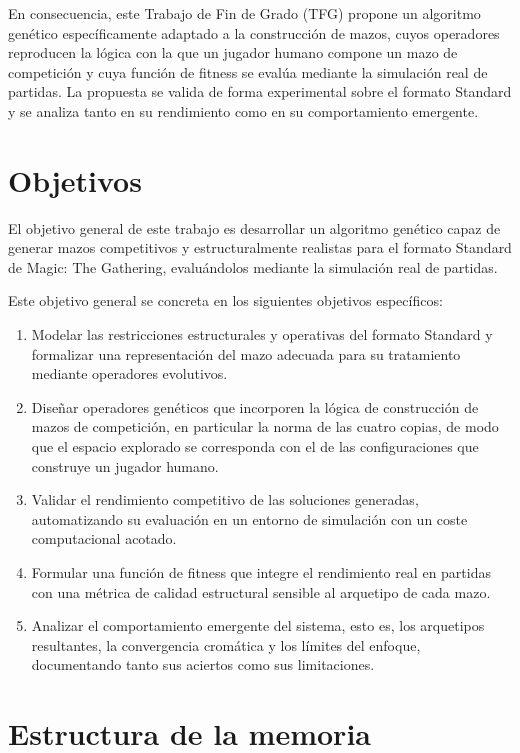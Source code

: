 En consecuencia, este Trabajo de Fin de Grado (TFG) propone un algoritmo genético específicamente adaptado a la construcción de mazos, cuyos operadores reproducen la lógica con la que un jugador humano compone un mazo de competición y cuya función de fitness se evalúa mediante la simulación real de partidas. La propuesta se valida de forma experimental sobre el formato Standard y se analiza tanto en su rendimiento como en su comportamiento emergente.

\section{Objetivos}
\label{sec:objetivos}

El objetivo general de este trabajo es desarrollar un algoritmo genético capaz de generar mazos competitivos y estructuralmente realistas para el formato Standard de Magic: The Gathering, evaluándolos mediante la simulación real de partidas.

Este objetivo general se concreta en los siguientes objetivos específicos:

\begin{enumerate}
    \item Modelar las restricciones estructurales y operativas del formato Standard y formalizar una representación del mazo adecuada para su tratamiento mediante operadores evolutivos.
    \item Diseñar operadores genéticos que incorporen la lógica de construcción de mazos de competición, en particular la norma de las cuatro copias, de modo que el espacio explorado se corresponda con el de las configuraciones que construye un jugador humano.
    \item Validar el rendimiento competitivo de las soluciones generadas, automatizando su evaluación en un entorno de simulación con un coste computacional acotado.
    \item Formular una función de fitness que integre el rendimiento real en partidas con una métrica de calidad estructural sensible al arquetipo de cada mazo.
    \item Analizar el comportamiento emergente del sistema, esto es, los arquetipos resultantes, la convergencia cromática y los límites del enfoque, documentando tanto sus aciertos como sus limitaciones.
\end{enumerate}

\section{Estructura de la memoria}

